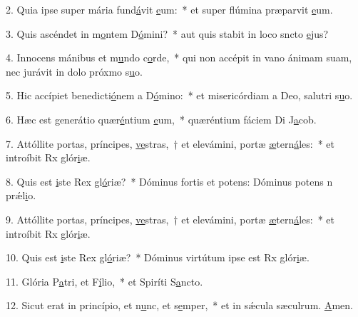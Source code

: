 2. Quia ipse super mária fund\uline{á}vit \uline{e}um:~* et super flúmina præparvit \uline{e}um.\par 
3. Quis ascéndet in m\uline{o}ntem D\uline{ó}mini?~* aut quis stabit in loco sncto \uline{e}jus?\par 
4. Innocens mánibus et m\uline{u}ndo c\uline{o}rde,~* qui non accépit in vano ánimam suam, nec jurávit in dolo próxmo s\uline{u}o.\par 
5. Hic accípiet benedicti\uline{ó}nem a D\uline{ó}mino:~* et misericórdiam a Deo, salutri s\uline{u}o.\par 
6. Hæc est generátio quær\uline{é}ntium \uline{e}um,~* quæréntium fáciem Di J\uline{a}cob.\par 
7. Attóllite portas, príncipes, \uline{ve}stras,~† et elevámini, portæ \uline{æ}tern\uline{á}les:~* et introíbit Rx glór\uline{i}æ.\par 
8. Quis est \uline{i}ste Rex gl\uline{ó}riæ?~* Dóminus fortis et potens: Dóminus potens n prǽl\uline{i}o.\par 
9. Attóllite portas, príncipes, \uline{ve}stras,~† et elevámini, portæ \uline{æ}tern\uline{á}les:~* et introíbit Rx glór\uline{i}æ.\par 
10. Quis est \uline{i}ste Rex gl\uline{ó}riæ?~* Dóminus virtútum ipse est Rx glór\uline{i}æ.\par 
11. Glória P\uline{a}tri, et F\uline{í}lio,~* et Spiríti S\uline{a}ncto.\par 
12. Sicut erat in princípio, et n\uline{u}nc, et s\uline{e}mper,~* et in sǽcula sæculrum. \uline{A}men.\par 
